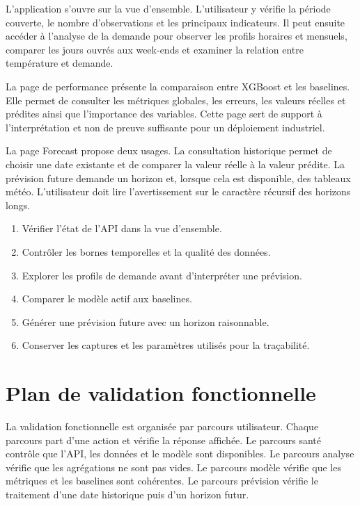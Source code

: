\documentclass[12pt,a4paper]{report}
\begin{document}
L'application s'ouvre sur la vue d'ensemble. L'utilisateur y vérifie la
période couverte, le nombre d'observations et les principaux indicateurs. Il
peut ensuite accéder à l'analyse de la demande pour observer les profils
horaires et mensuels, comparer les jours ouvrés aux week-ends et examiner la
relation entre température et demande.

La page de performance présente la comparaison entre XGBoost et les
baselines. Elle permet de consulter les métriques globales, les erreurs, les
valeurs réelles et prédites ainsi que l'importance des variables. Cette page
sert de support à l'interprétation et non de preuve suffisante pour un
déploiement industriel.

La page Forecast propose deux usages. La consultation historique permet de
choisir une date existante et de comparer la valeur réelle à la valeur
prédite. La prévision future demande un horizon et, lorsque cela est
disponible, des tableaux météo. L'utilisateur doit lire l'avertissement sur
le caractère récursif des horizons longs.

\begin{enumerate}
\item Vérifier l'état de l'API dans la vue d'ensemble.
\item Contrôler les bornes temporelles et la qualité des données.
\item Explorer les profils de demande avant d'interpréter une prévision.
\item Comparer le modèle actif aux baselines.
\item Générer une prévision future avec un horizon raisonnable.
\item Conserver les captures et les paramètres utilisés pour la traçabilité.
\end{enumerate}

\section{Plan de validation fonctionnelle}

La validation fonctionnelle est organisée par parcours utilisateur. Chaque
parcours part d'une action et vérifie la réponse affichée. Le parcours santé
contrôle que l'API, les données et le modèle sont disponibles. Le parcours
analyse vérifie que les agrégations ne sont pas vides. Le parcours modèle
vérifie que les métriques et les baselines sont cohérentes. Le parcours
prévision vérifie le traitement d'une date historique puis d'un horizon futur.
\end{document}
